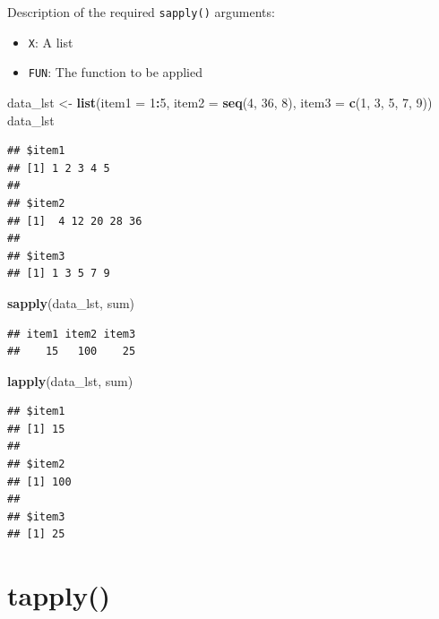 \documentclass[
]{book}
\newenvironment{Shaded}{\begin{snugshade}}{\end{snugshade}}
\newcommand{\DataTypeTok}[1]{\textcolor[rgb]{0.13,0.29,0.53}{#1}}
\newcommand{\DecValTok}[1]{\textcolor[rgb]{0.00,0.00,0.81}{#1}}
\newcommand{\KeywordTok}[1]{\textcolor[rgb]{0.13,0.29,0.53}{\textbf{#1}}}
\newcommand{\NormalTok}[1]{#1}
\newcommand{\OperatorTok}[1]{\textcolor[rgb]{0.81,0.36,0.00}{\textbf{#1}}}
\newcommand{\StringTok}[1]{\textcolor[rgb]{0.31,0.60,0.02}{#1}}
\providecommand{\tightlist}{%
  \setlength{\itemsep}{0pt}\setlength{\parskip}{0pt}}
\begin{document}
Description of the required \texttt{sapply()} arguments:

\begin{itemize}
\tightlist
\item
  \texttt{X}: A list
\item
  \texttt{FUN}: The function to be applied
\end{itemize}

\begin{Shaded}
\begin{Highlighting}[]
\NormalTok{data_lst <-}\StringTok{ }\KeywordTok{list}\NormalTok{(}\DataTypeTok{item1 =} \DecValTok{1}\OperatorTok{:}\DecValTok{5}\NormalTok{, }\DataTypeTok{item2 =} \KeywordTok{seq}\NormalTok{(}\DecValTok{4}\NormalTok{, }\DecValTok{36}\NormalTok{, }\DecValTok{8}\NormalTok{), }\DataTypeTok{item3 =} \KeywordTok{c}\NormalTok{(}\DecValTok{1}\NormalTok{,}
    \DecValTok{3}\NormalTok{, }\DecValTok{5}\NormalTok{, }\DecValTok{7}\NormalTok{, }\DecValTok{9}\NormalTok{))}
\NormalTok{data_lst}
\end{Highlighting}
\end{Shaded}

\begin{verbatim}
## $item1
## [1] 1 2 3 4 5
## 
## $item2
## [1]  4 12 20 28 36
## 
## $item3
## [1] 1 3 5 7 9
\end{verbatim}

\begin{Shaded}
\begin{Highlighting}[]
\KeywordTok{sapply}\NormalTok{(data_lst, sum)}
\end{Highlighting}
\end{Shaded}

\begin{verbatim}
## item1 item2 item3 
##    15   100    25
\end{verbatim}

\begin{Shaded}
\begin{Highlighting}[]
\KeywordTok{lapply}\NormalTok{(data_lst, sum)}
\end{Highlighting}
\end{Shaded}

\begin{verbatim}
## $item1
## [1] 15
## 
## $item2
## [1] 100
## 
## $item3
## [1] 25
\end{verbatim}

\hypertarget{tapply}{%
\section{tapply()}\label{tapply}}
\end{document}
